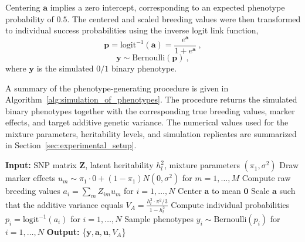 %
Centering $\mathbf{a}$ implies a zero intercept, corresponding to an expected phenotype probability of $0.5$. The centered and scaled breeding values were then transformed to individual success probabilities using the inverse logit link function, 
%
\begin{equation}
\label{eq:sim_prob}
\mathbf{p} = \text{logit}^{-1}(\mathbf{a}) = \frac{e^{\mathbf{a}}}{1 + e^{\mathbf{a}}} \ ,
\end{equation}
%
\[
\mathbf{y} \sim \text{Bernoulli}(\mathbf{p}) \ ,
\]
where $\mathbf{y}$ is the simulated $0/1$ binary phenotype. 





A summary of the phenotype-generating procedure is given in Algorithm~\ref{alg:simulation_of_phenotypes}. The procedure returns the simulated binary phenotypes together with the corresponding true breeding values, marker effects, and target additive genetic variance. The numerical values used for the mixture parameters, heritability levels, and simulation replicates are summarized in Section~\ref{sec:experimental_setup}.


\begin{algorithm}[H]
\caption{Simulation of binary phenotypes}
\label{alg:simulation_of_phenotypes}
\begin{algorithmic}[1]
\State \textbf{Input:} SNP matrix $\mathbf{Z}$, latent heritability $h^2_l$, mixture parameters $(\pi_1, \sigma^2)$
\State Draw marker effects $u_m \sim \pi_1 \cdot 0 + (1-\pi_1)N(0,\sigma^2)$ for $m = 1, \dots, M$
\State Compute raw breeding values $a_i = \sum_m Z_{im} u_m$ for $i = 1, \dots, N$
\State Center $\mathbf{a}$ to mean $\mathbf{0}$
\State Scale $\mathbf{a}$ such that the additive variance equals $V_A = \frac{h^2_l \cdot \pi^2/3}{1-h^2_l}$
\State Compute individual probabilities $p_i = \text{logit}^{-1}(a_i)$ for $i = 1,\ldots,N$
\State Sample phenotypes $y_i \sim \mathrm{Bernoulli}(p_i)$ for $i = 1,\ldots,N$
\State \textbf{Output:} \{$\mathbf{y}, \mathbf{a}, \mathbf{u}, V_A$\}
\end{algorithmic}
\end{algorithm}



